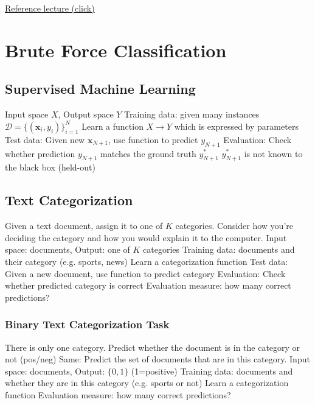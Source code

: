 \documentclass{article}
\renewcommand{\vec}[1]{%
	\mathbf{#1}%
}
\begin{document}
	\href{https://mycourses.unh.edu/courses/152824/files/folder/lecture?preview=15838160}{\textsf{Reference lecture (click)}}
	\section{Brute Force Classification}
	\subsection{Supervised Machine Learning}
	\begin{outline}
		\1 Input space $X$, Output space $Y$
		\1 Training data: given many instances $\mathcal{D} = \{(\vec{x}_i, y_i)\}^N_{i=1}$
		\1 Learn a function $X \rightarrow Y$ which is expressed by parameters
		\1 Test data: Given new $\vec{x}_{N+1}$, use function to predict $y_{N+1}$
		\1 Evaluation: Check whether prediction $y_{N+1}$ matches the ground truth $y^*_{N+1}$
		\1 $y^*_{N+1}$ is not known to the black box (held-out)
	\end{outline}
	\subsection{Text Categorization}
	\begin{outline}
		\1 Given a text document, assign it to one of $K$ categories.
		\1 Consider how you're deciding the category and how you would explain it to the computer.
		\1 Input space: documents, Output: one of $K$ categories
		\1 Training data: documents and their category (e.g. sports, news)
		\1 Learn a categorization function
		\1 Test data: Given a new document, use function to predict category
		\1 Evaluation: Check whether predicted category is correct
		\1 Evaluation measure: how many correct predictions?
	\end{outline}
	\subsubsection{Binary Text Categorization Task}
	\begin{outline}
		\1 There is only one category.
		\1 Predict whether the document is in the category or not (pos/neg)
		\1 Same: Predict the set of documents that are in this category.
		\1 Input space: documents, Output: $\{0, 1\}$ (1=positive)
		\1 Training data: documents and whether they are in this category (e.g. sports or not)
		\1 Learn a categorization function
		\1 Evaluation measure: how many correct predictions?
	\end{outline}
\end{document}
